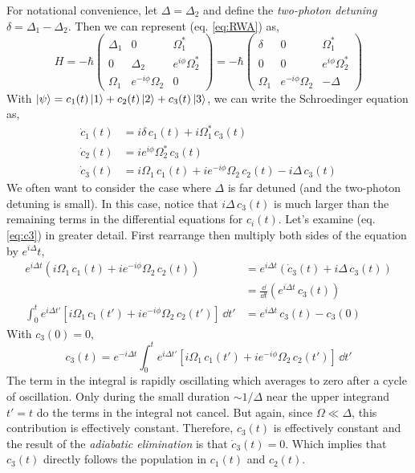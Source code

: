 \documentclass[10pt]{article}
\begin{document}
For notational convenience, let $\Delta = \Delta_2$ and define the \textit{two-photon detuning} $\delta=\Delta_1-\Delta_2$. Then we can represent (eq. \ref{eq:RWA}) as,
\begin{equation}
    H = -\hbar
    \begin{pmatrix}
        \Delta_1 & 0 & \Omega_1^*\\
        0 & \Delta_2 & e^{i\phi}\Omega_2^*\\
         \Omega_1& e^{-i\phi}\Omega_2 & 0
    \end{pmatrix}
    =
    -\hbar
    \begin{pmatrix}
        \delta & 0 & \Omega_1^*\\
        0 & 0 & e^{i\phi}\Omega_2^*\\
         \Omega_1& e^{-i\phi}\Omega_2 & -\Delta
    \end{pmatrix}
\end{equation}
With $\ket{\psi} = c_1(t)\ket{1} + c_2(t)\ket{2} + c_3(t)\ket{3}$, we can write the Schroedinger equation as,
\begin{align}
    \dot{c}_1(t) &= i\delta\,c_1(t) + i\Omega_1^*\,c_3(t) \\
    \dot{c}_2(t) &= ie^{i\phi}\Omega_2^*\,c_3(t)\\
    \dot{c}_3(t) &= i\Omega_1\,c_1(t) + ie^{-i\phi}\Omega_2\,c_2(t) - i\Delta\,c_3(t) \label{eq:c3}
\end{align}
We often want to consider the case where $\Delta$ is far detuned (and the two-photon detuning is small). In this case, notice that $i\Delta\,c_3(t)$ is much larger than the remaining terms in the differential equations for $c_i(t)$. Let's examine (eq. \ref{eq:c3}) in greater detail. First rearrange then multiply both sides of the equation by $e^{i\Delta}t$,
\begin{align}
    e^{i\Delta t}(i\Omega_1\,c_1(t) + ie^{-i\phi}\Omega_2\,c_2(t)) &= e^{i\Delta t}(\dot{c}_3(t) + i\Delta\,c_3(t)) \\
    &=\frac{\dd}{\dd t}\left( e^{i\Delta t}\,c_3(t) \right) \\
    \int_0^t e^{i\Delta t'}\left[ i\Omega_1\,c_1(t') + ie^{-i\phi}\Omega_2\,c_2(t')\right]\,\dd t' &= e^{i\Delta t}\,c_3(t) - c_3(0)
\end{align}
With $c_3(0) = 0$,
\begin{equation}
    c_3(t) = e^{-i\Delta t} \int_0^t e^{i\Delta t'}\left[ i\Omega_1\,c_1(t') + ie^{-i\phi}\Omega_2\,c_2(t')\right]\,\dd t'
\end{equation}
The term in the integral is rapidly oscillating which averages to zero after a cycle of oscillation. Only during the small duration $\sim1/\Delta$ near the upper integrand $t'=t$ do the terms in the integral not cancel. But again, since $\Omega\ll\Delta$, this contribution is effectively constant. Therefore, $c_3(t)$ is effectively constant and the result of the \textit{adiabatic elimination} is that $\dot{c}_3(t) = 0$. Which implies that $c_3(t)$ directly follows the population in $c_1(t)$ and $c_2(t)$.
\end{document}
